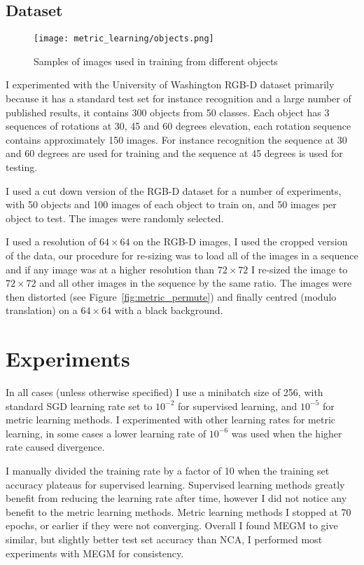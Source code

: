 \subsection {Dataset}

\begin{figure}[h]
\centering
\texttt{[image: metric\_learning/objects.png]}
\caption{Samples of images used in training from different objects}
\label{fig:metric_dataset}
\end{figure}

I experimented with the University of Washington RGB-D dataset primarily because it has a standard test set for instance recognition and a large number of published results, it contains 300 objects from 50 classes. Each object has 3 sequences of rotations at 30, 45 and 60 degrees elevation, each rotation sequence contains approximately 150 images. For instance recognition the sequence at 30 and 60 degrees are used for training and the sequence at 45 degrees is used for testing. 

I used a cut down version of the RGB-D dataset for a number of experiments, with 50 objects and 100 images of each object to train on, and 50 images per object to test. The images were randomly selected.

I used a resolution of $ 64\times64 $ on the RGB-D images, I used the cropped version of the data, our procedure for re-sizing was to load all of the images in a sequence and if any image was at a higher resolution than $ 72\times72 $ I re-sized the image to $ 72\times72 $ and all other images in the sequence by the same ratio. The images were then distorted (see Figure~\ref{fig:metric_permute}) and finally centred (modulo translation) on a  $ 64\times64 $ with a black background.


\section {Experiments}


In all cases (unless otherwise specified) I use a minibatch size of 256, with standard \gls{SGD} learning rate set to $ 10^{-2} $ for supervised learning, and $ 10^{-5} $ for metric learning methods. I experimented with other learning rates for metric learning, in some cases a lower learning rate of $ 10^{-6} $ was used when the higher rate caused divergence.

I manually divided the training rate by a factor of 10 when the training set accuracy plateaus for supervised learning. Supervised learning methods greatly benefit from reducing the learning rate after time, however I did not notice any benefit to the metric learning methods. Metric learning methods I stopped at 70 epochs, or earlier if they were not converging. Overall I found \gls{MEGM} to give similar, but slightly better test set accuracy than \gls{NCA}, I performed most experiments with \gls{MEGM} for consistency.



